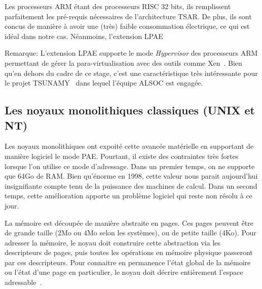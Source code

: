 
    Les processeurs ARM étant des processeurs RISC 32 bits, ils remplissent
    parfaitement les pré-requis nécessaires de l'architecture TSAR. De plus, ils
    sont concus de manière à avoir une (très) faible consommation électrique, ce
    qui est idéal dans notre cas. Néanmoins, l'extension LPAE

    \begin{paragraph}{Remarque:}
      L'extension LPAE supporte le mode \textit{Hypervisor} des processeurs ARM
      permettant de gérer la para-virtualisation avec des outils comme
      Xen~\cite{barham2003xen}. Bien qu'en dehors du cadre de ce stage, c'est
      une caractéristique très intéressante pour le projet
      TSUNAMY~\cite{tsunamy2013web} dans lequel l'équipe ALSOC est engagée.
    \end{paragraph}


    \subsection{Les noyaux monolithiques classiques (UNIX et NT)}

      Les noyaux monolithiques ont expoité cette avancée matérielle en
      supportant de manière logiciel le mode PAE. Pourtant, il existe des
      contraintes très fortes lorsque l'on utilise ce mode d'adressage. Dans un
      premier temps, on ne supporte que 64Go de RAM. Bien qu'énorme en 1998,
      cette valeur nous parait aujourd'hui insignifiante compte tenu de la
      puissance des machines de calcul.  Dans un second temps, cette
      amélioration apporte un problème logiciel qui reste non résolu à ce
      jour.\newline

      La mémoire est découpée de manière abstraite en pages. Ces pages peuvent
      être de grande taille (2Mo ou 4Mo selon les systèmes), ou de petite taille
      (4Ko). Pour adresser la mémoire, le noyau doit construire cette
      abstraction via les descripteurs de pages, puis toutes les opérations en
      mémoire physique passeront par ces descripteurs. Pour connaitre en
      permanence l'état global de la mémoire ou l'état d'une page en
      particulier, le noyau doit décrire entièrement l'espace
      adressable~\citep{cranor1999uvm, gorman2004understanding,
        russinovich2012windows, dillon2000design, steldt2009memory,
        steldtXXXXopenbsd}.

